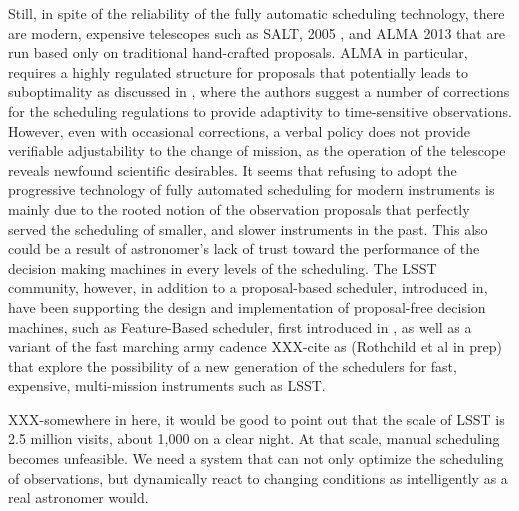 \documentclass[12pt,aas_macros]{article}
\theoremstyle{definition}
\begin{document}
Still, in spite of the reliability of the fully automatic scheduling technology, there are modern, expensive telescopes such as SALT, 2005 \cite{brink2008salt}, and ALMA 2013 \cite{wootten2003atacama} that are run based only on traditional hand-crafted proposals. ALMA in particular, requires a highly regulated structure for proposals that potentially leads to suboptimality as discussed in \cite{alexander2017enabling}, where the authors suggest a number of corrections for the scheduling regulations to provide adaptivity to time-sensitive observations. However, even with occasional corrections, a verbal policy does not provide verifiable adjustability to the change of mission, as the operation of the telescope reveals newfound scientific desirables. It seems that refusing to adopt the progressive technology of fully automated scheduling for modern instruments is mainly due to the rooted notion of the observation proposals that perfectly served the scheduling of smaller, and slower instruments in the past. This also could be a result of astronomer's lack of trust toward the performance of the decision making machines in every levels of the scheduling. The LSST community, however, in addition to a proposal-based scheduler, introduced in\cite{delgado2016lsst}, have been supporting the design and implementation of proposal-free decision machines, such as Feature-Based scheduler, first introduced in \cite{naghib2016feature}, as well as a variant of the fast marching army cadence XXX-cite as (Rothchild et al in prep) that explore the possibility of a new generation of the schedulers for fast, expensive, multi-mission instruments such as LSST.

XXX-somewhere in here, it would be good to point out that the scale of LSST is 2.5 million visits, about 1,000 on a clear night. At that scale, manual scheduling becomes unfeasible. We need a system that can not only optimize the scheduling of observations, but dynamically react to changing conditions as intelligently as a real astronomer would. 
\end{document}
